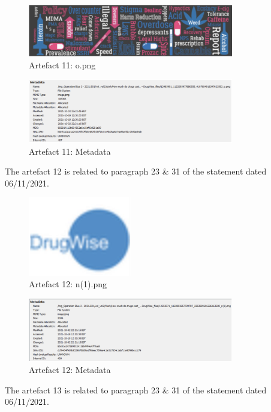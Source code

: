 \begin{figure}[H]
  \centering
  \includegraphics[width=0.8\textwidth]{figures/artefact11}
  \caption{Artefact 11: o.png}
  \label{f:artefact11}
\end{figure}
\begin{figure}[H]
  \centering
  \includegraphics[width=0.8\textwidth]{figures/meta11}
  \caption{Artefact 11: Metadata}
  \label{f:meta11}
\end{figure}
The artefact 12 is related to paragraph 23 \& 31 of the statement dated 06/11/2021.
\begin{figure}[H]
  \centering
  \includegraphics[width=0.4\textwidth]{figures/artifact12}
  \caption{Artefact 12: n(1).png}
  \label{f:artifact12}
\end{figure}
\begin{figure}[H]
  \centering
  \includegraphics[width=0.8\textwidth]{figures/meta12}
  \caption{Artefact 12: Metadata}
  \label{f:meta12}
\end{figure}
The artefact 13 is related to paragraph 23 \& 31 of the statement dated
06/11/2021.

